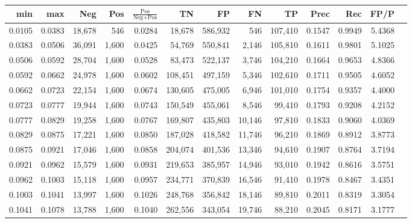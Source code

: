 \begin{tabular}{rrrrrrrrrrrrr}
\toprule
   min &    max &    Neg &   Pos & $\frac{\text{Pos}}{\text{Neg}+\text{Pos}}$ &      TN &      FP &      FN &      TP &   Prec &    Rec &   FP/P \\
\midrule
0.0105 & 0.0383 & 18,678 &   546 &                                     0.0284 &  18,678 & 586,932 &     546 & 107,410 & 0.1547 & 0.9949 & 5.4368 \\
0.0383 & 0.0506 & 36,091 & 1,600 &                                     0.0425 &  54,769 & 550,841 &   2,146 & 105,810 & 0.1611 & 0.9801 & 5.1025 \\
0.0506 & 0.0592 & 28,704 & 1,600 &                                     0.0528 &  83,473 & 522,137 &   3,746 & 104,210 & 0.1664 & 0.9653 & 4.8366 \\
0.0592 & 0.0662 & 24,978 & 1,600 &                                     0.0602 & 108,451 & 497,159 &   5,346 & 102,610 & 0.1711 & 0.9505 & 4.6052 \\
0.0662 & 0.0723 & 22,154 & 1,600 &                                     0.0674 & 130,605 & 475,005 &   6,946 & 101,010 & 0.1754 & 0.9357 & 4.4000 \\
0.0723 & 0.0777 & 19,944 & 1,600 &                                     0.0743 & 150,549 & 455,061 &   8,546 &  99,410 & 0.1793 & 0.9208 & 4.2152 \\
0.0777 & 0.0829 & 19,258 & 1,600 &                                     0.0767 & 169,807 & 435,803 &  10,146 &  97,810 & 0.1833 & 0.9060 & 4.0369 \\
0.0829 & 0.0875 & 17,221 & 1,600 &                                     0.0850 & 187,028 & 418,582 &  11,746 &  96,210 & 0.1869 & 0.8912 & 3.8773 \\
0.0875 & 0.0921 & 17,046 & 1,600 &                                     0.0858 & 204,074 & 401,536 &  13,346 &  94,610 & 0.1907 & 0.8764 & 3.7194 \\
0.0921 & 0.0962 & 15,579 & 1,600 &                                     0.0931 & 219,653 & 385,957 &  14,946 &  93,010 & 0.1942 & 0.8616 & 3.5751 \\
0.0962 & 0.1003 & 15,118 & 1,600 &                                     0.0957 & 234,771 & 370,839 &  16,546 &  91,410 & 0.1978 & 0.8467 & 3.4351 \\
0.1003 & 0.1041 & 13,997 & 1,600 &                                     0.1026 & 248,768 & 356,842 &  18,146 &  89,810 & 0.2011 & 0.8319 & 3.3054 \\
0.1041 & 0.1078 & 13,788 & 1,600 &                                     0.1040 & 262,556 & 343,054 &  19,746 &  88,210 & 0.2045 & 0.8171 & 3.1777 \\

\end{tabular}
